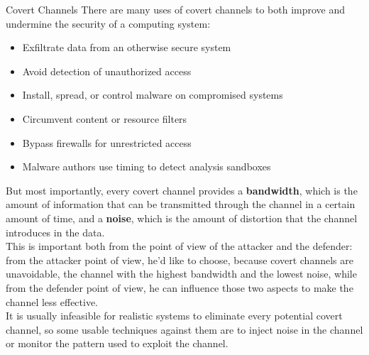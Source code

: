 \begin{section}{Covert Channels}
  There are many uses of covert channels to both improve and undermine the security of a computing
  system:
  \begin{itemize}
    \item Exfiltrate data from an otherwise secure system
    \item Avoid detection of unauthorized access
    \item Install, spread, or control malware on compromised systems
    \item Circumvent content or resource filters
    \item Bypass firewalls for unrestricted access
    \item Malware authors use timing to detect analysis sandboxes
  \end{itemize}

  But most importantly, every covert channel provides a \textbf{bandwidth}, which is the amount of
  information that can be transmitted through the channel in a certain amount of time, and a
  \textbf{noise}, which is the amount of distortion that the channel introduces in the data.\\
  This is important both from the point of view of the attacker and the defender: from the attacker
  point of view, he'd like to choose, because covert channels are unavoidable, the channel with the
  highest bandwidth and the lowest noise, while from the defender point of view, he can influence
  those two aspects to make the channel less effective.\\

  It is usually infeasible for realistic systems to eliminate every potential covert
  channel, so some usable techniques against them are to inject noise in the channel or monitor the
  pattern used to exploit the channel.
\end{section}

